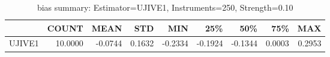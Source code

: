 \begin{table}[ht]
\centering
\caption{bias summary: Estimator=UJIVE1, Instruments=250, Strength=0.10}
\begin{tabular}{lrrrrrrrr}
\toprule
 & COUNT & MEAN & STD & MIN & 25\% & 50\% & 75\% & MAX \\
\midrule
UJIVE1 & 10.0000 & -0.0744 & 0.1632 & -0.2334 & -0.1924 & -0.1344 & 0.0003 & 0.2953 \\
\bottomrule
\end{tabular}
\end{table}
